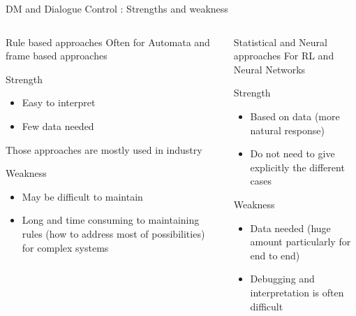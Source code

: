 \documentclass[10pt,aspectratio=169]{beamer}
\begin{document}
\begin{frame}{DM and Dialogue Control : Strengths and weakness}
    \begin{columns}
        \begin{column}{0.5\textwidth}
                
                \begin{block}{Rule based approaches}
                    Often for Automata and frame based approaches 

                    \begin{block}{Strength}
                        \begin{itemize}
                            \item Easy to interpret 
                            \item Few data needed
                        \end{itemize}   
                        Those approaches are mostly used in industry
                    \end{block}
                    \begin{alertblock}{Weakness}
                        \begin{itemize}
                            \item May be difficult to maintain
                            \item Long and time consuming to maintaining rules (how to address most of possibilities) for complex systems
                        \end{itemize}   
                    \end{alertblock}
                \end{block}
            
            \end{column}
        \begin{column}{0.5\textwidth}
            \begin{block}{Statistical and Neural approaches}
                For RL and Neural Networks
                    \begin{block}{Strength}
                        \begin{itemize}
                            \item Based on data (more natural response)
                            \item Do not need to give explicitly the different cases
                        \end{itemize}   
                    \end{block}
                    \begin{alertblock}{Weakness}
                        \begin{itemize}
                            \item Data needed (huge amount particularly for end to end)
                            \item Debugging and interpretation is often difficult
                        \end{itemize}   
                    \end{alertblock}


\end{block}
\end{column}
\end{columns}
\end{frame}
\end{document}
